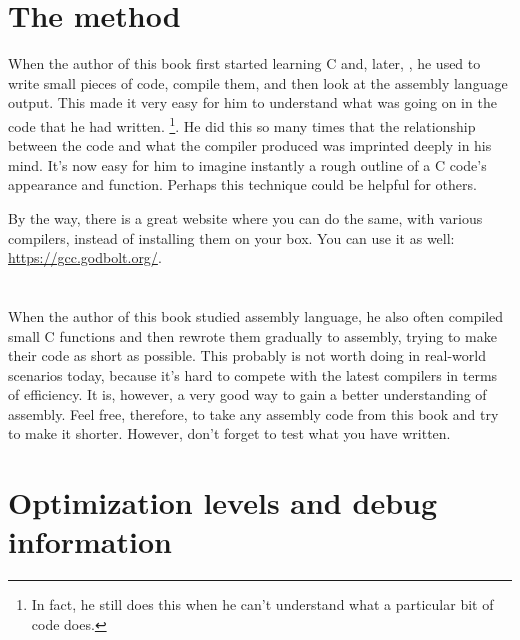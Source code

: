 \section{The method}

When the author of this book first started learning C and, later, \Cpp, he used to write small pieces of code, compile them,
and then look at the assembly language output. This made it very easy for him to understand what was going on in the code that he had written.
\footnote{In fact, he still does this when he can't understand what a particular bit of code does.}.
He did this so many times that the relationship between the \CCpp code and what the compiler produced was imprinted deeply in his mind.
It's now easy for him to imagine instantly a rough outline of a C code's appearance and function.
Perhaps this technique could be helpful for others.


By the way, there is a great website where you can do the same, with various compilers, instead of installing them on your box.
You can use it as well: \url{https://gcc.godbolt.org/}.

\section*{\Exercises}

When the author of this book studied assembly language, he also often compiled small C functions and then rewrote
them gradually to assembly, trying to make their code as short as possible.
This probably is not worth doing in real-world scenarios today,
because it's hard to compete with the latest compilers in terms of efficiency. It is, however, a very good way to gain a better understanding of assembly.
Feel free, therefore, to take any assembly code from this book and try to make it shorter.
However, don't forget to test what you have written.

\section*{Optimization levels and debug information}

